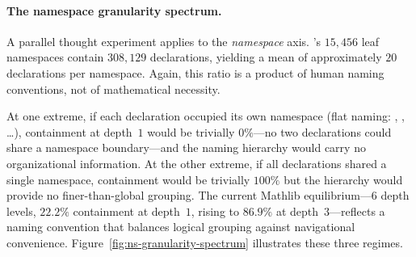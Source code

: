 \paragraph{The namespace granularity spectrum.}
A parallel thought experiment applies to the \emph{namespace} axis. 's $15{,}456$ leaf namespaces contain $308{,}129$ declarations, yielding a mean of approximately $20$ declarations per namespace. Again, this ratio is a product of human naming conventions, not of mathematical necessity.

At one extreme, if each declaration occupied its own namespace (flat naming: , , \ldots), containment at depth~$1$ would be trivially $0\%$---no two declarations could share a namespace boundary---and the naming hierarchy would carry no organizational information. At the other extreme, if all declarations shared a single namespace, containment would be trivially $100\%$ but the hierarchy would provide no finer-than-global grouping. The current Mathlib equilibrium---$6$ depth levels, $22.2\%$ containment at depth~$1$, rising to $86.9\%$ at depth~$3$---reflects a naming convention that balances logical grouping against navigational convenience. Figure~\ref{fig:ns-granularity-spectrum} illustrates these three regimes.

